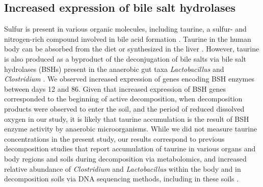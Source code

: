 \documentclass[
  sn-nature,
  lineno, referee]{sn-jnl}
\begin{document}
\subsection{Increased expression of bile salt
hydrolases}\label{increased-expression-of-bile-salt-hydrolases}

Sulfur is present in various organic molecules, including taurine, a
sulfur- and nitrogen-rich compound involved in bile acid formation
\citep{urdaneta_interactions_2017}. Taurine in the human body can be
absorbed from the diet or synthesized in the liver
\citep{seidel_taurine_2019}. However, taurine is also produced as a
byproduct of the deconjugation of bile salts via bile salt hydrolases
(BSHs) present in the anaerobic gut taxa \emph{Lactobacillus} and
\emph{Clostridium} \citep{urdaneta_interactions_2017}. We observed
increased expression of genes encoding BSH enzymes between days 12 and
86. Given that increased expression of BSH genes corresponded to the
beginning of active decomposition, when decomposition products were
observed to enter the soil, and the period of reduced dissolved oxygen
in our study, it is likely that taurine accumulation is the result of
BSH enzyme activity by anaerobic microorganisms. While we did not
measure taurine concentrations in the present study, our results
correspond to previous decomposition studies that report accumulation of
taurine in various organs and body regions
\citep{mora-ortiz_thanatometabolomics_2019, locci_1h_2019, zelentsova_post-mortem_2016}
and soils
\citep{debruyn_comparative_2021, hoeland_katharina_investigating_2021}
during decomposition via metabolomics, and increased relative abundance
of \emph{Clostridium }and \emph{Lactobacillus} within the body
\citep{javan_human_2016, javan_cadaver_2017, debruyn_postmortem_2017}
and in decomposition soils \citep{cobaugh_functional_2015} via DNA
sequencing methods, including in these soils
\citep{taylor_transient_2024}.
\end{document}
